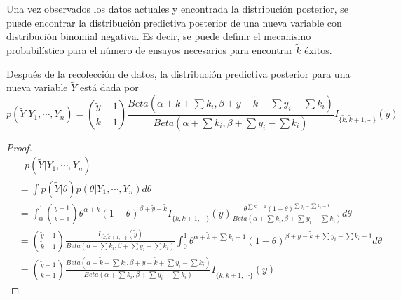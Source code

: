\documentclass[10pt,openright]{book}\usepackage[]{graphicx}\usepackage[]{color}
\begin{document}
    Una vez observados los datos actuales y encontrada la distribuci\'on posterior, se puede encontrar la distribuci\'on predictiva posterior de una nueva variable con distribuci\'on binomial negativa. Es decir, se puede definir el mecanismo probabil\'istico para el n\'umero de ensayos necesarios para encontrar $\tilde{k}$ \'exitos.
    \begin{Res}
    Despu\'es de la recolecci\'on de datos, la distribuci\'on predictiva posterior para una nueva variable $\tilde{Y}$ est\'a dada por
    \begin{equation*}
    p(\tilde{Y}|Y_1,\cdots,Y_n)=\binom{\tilde{y}-1}{\tilde{k}-1}\frac{Beta(\alpha+\tilde{k}+\sum k_i,\beta+\tilde{y}-\tilde{k}+\sum y_i-\sum k_i)}{Beta(\alpha+\sum k_i,\beta+\sum y_i-\sum k_i)}I_{\{\tilde{k},\tilde{k}+1,\cdots\}}(\tilde{y})
    \end{equation*}
    \end{Res}
    
    \begin{proof}
    \begin{align*}
    &\ \ \ p(\tilde{Y}|Y_1,\cdots,Y_n)\\
    &=\int p(\tilde{Y}|\theta)p(\theta|Y_1,\cdots,Y_n)d\theta\\
    &=\int_{0}^1\binom{\tilde{y}-1}{\tilde{k}-1}\theta^{\alpha+\tilde{k}}(1-\theta)^{\beta+\tilde{y}-\tilde{k}}I_{\{\tilde{k},\tilde{k}+1,\cdots\}}(\tilde{y})\frac{\theta^{\sum k_i-1}(1-\theta)^{\sum y_i-\sum k_i-1}}{Beta(\alpha+\sum k_i,\beta+\sum y_i-\sum k_i)}d\theta\\
    &=\binom{\tilde{y}-1}{\tilde{k}-1}\frac{I_{\{\tilde{k},\tilde{k}+1,\cdots\}}(\tilde{y})}{Beta(\alpha+\sum k_i,\beta+\sum y_i-\sum k_i)}\int_{0}^1\theta^{\alpha+\tilde{k}+\sum k_i-1}(1-\theta)^{\beta+\tilde{y}-\tilde{k}+\sum y_i-\sum k_i-1}d\theta\\
    &=\binom{\tilde{y}-1}{\tilde{k}-1}\frac{Beta(\alpha+\tilde{k}+\sum k_i,\beta+\tilde{y}-\tilde{k}+\sum y_i-\sum k_i)}{Beta(\alpha+\sum k_i,\beta+\sum y_i-\sum k_i)}I_{\{\tilde{k},\tilde{k}+1,\cdots\}}(\tilde{y})
    \end{align*}
    \end{proof}
    
\end{document}
